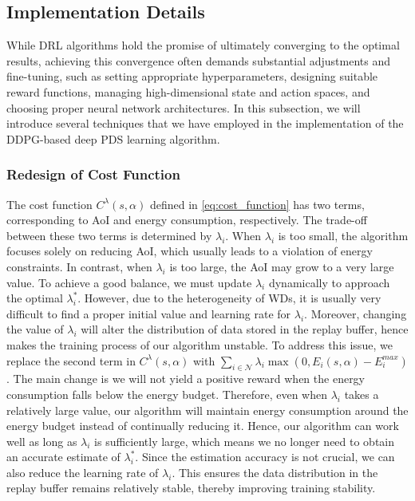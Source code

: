 \documentclass[lettersize, journal]{IEEEtran}
\begin{document}
\subsection{Implementation Details}
While DRL algorithms hold the promise of ultimately converging to the optimal results, achieving this convergence often demands substantial adjustments and fine-tuning, such as setting appropriate hyperparameters, designing suitable reward functions, managing high-dimensional state and action spaces, and choosing proper neural network architectures.
In this subsection, we will introduce several techniques that we have employed in the implementation of the DDPG-based deep PDS learning algorithm.

\subsubsection{Redesign of Cost Function} \label{subsubsection:redesign_cost}
The cost function $C^{\lambda}(s,\alpha)$ defined in \eqref{eq:cost_function} has two terms, corresponding to AoI and energy consumption, respectively.
The trade-off between these two terms is determined by $\lambda_i$.
When $\lambda_i$ is too small, the algorithm focuses solely on reducing AoI, which usually leads to a violation of energy constraints.
In contrast, when $\lambda_i$ is too large, the AoI may grow to a very large value.
To achieve a good balance, we must update $\lambda_i$ dynamically to approach the optimal $\lambda^*_i$.
However, due to the heterogeneity of WDs, it is usually very difficult to find a proper initial value and learning rate for $\lambda_i$.
Moreover, changing the value of $\lambda_i$ will alter the distribution of data stored in the replay buffer,
hence makes the training process of our algorithm unstable.
To address this issue, we replace the second term in $C^{\lambda}(s,\alpha)$ with $\sum_{i\in\mathcal{N}} \lambda_i \max(0, E_i(s, \alpha) - E^{max}_i)$.
The main change is we will not yield a positive reward when the energy consumption falls below the energy budget.
Therefore, even when $\lambda_i$ takes a relatively large value, 
our algorithm will maintain energy consumption around the energy budget instead of continually reducing it.
Hence, our algorithm can work well as long as $\lambda_i$ is sufficiently large, which
means we no longer need to obtain an accurate estimate of $\lambda^*_i$.
Since the estimation accuracy is not crucial, we can also reduce the learning rate of $\lambda_i$.
This ensures the data distribution in the replay buffer remains relatively stable, 
thereby improving training stability.
\end{document}
